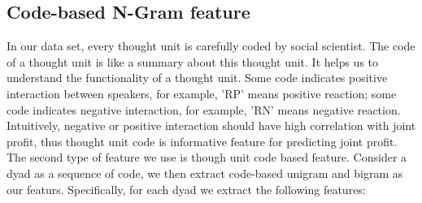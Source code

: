 \documentclass[11pt]{article} %
\begin{document}
\subsection{Code-based N-Gram feature}
In our data set, every thought unit is carefully coded by social scientist. The code of a thought unit is like a summary about this thought unit. It helps us to understand the functionality of a thought unit. Some code indicates positive interaction between speakers, for example, 'RP' means positive reaction; some code indicates negative interaction, for example, 'RN' means negative reaction. Intuitively, negative or positive interaction should have high correlation with joint profit, thus thought unit code is informative feature for predicting joint profit. The second type of feature we use is though unit code based feature. Consider a dyad as a sequence of code, we then extract code-based unigram and bigram as our featurs. Specifically, for each dyad we extract the following features:
\end{document}
